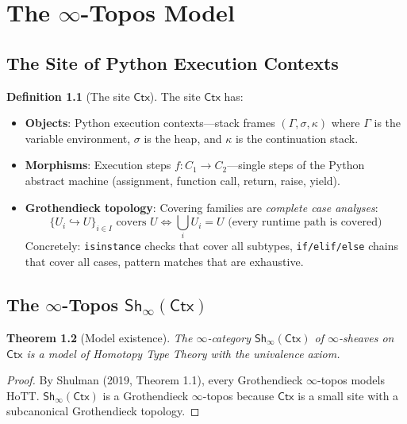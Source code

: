 \documentclass[11pt,a4paper]{report}
\theoremstyle{definition}
\newtheorem{definition}{Definition}[chapter]
\theoremstyle{plain}
\newtheorem{theorem}[definition]{Theorem}
\newcommand{\Ctx}{\mathsf{Ctx}}
\newcommand{\Sh}{\mathsf{Sh}}
\begin{document}
\chapter{The $\infty$-Topos Model}
\label{ch:model}

\section{The Site of Python Execution Contexts}

\begin{definition}[The site $\Ctx$]
The site $\Ctx$ has:
\begin{itemize}
  \item \textbf{Objects}: Python execution contexts---stack frames $(\Gamma, \sigma, \kappa)$
    where $\Gamma$ is the variable environment, $\sigma$ is the heap, and $\kappa$ is
    the continuation stack.
  \item \textbf{Morphisms}: Execution steps $f : C_1 \to C_2$---single steps of
    the Python abstract machine (assignment, function call, return, raise, yield).
  \item \textbf{Grothendieck topology}: Covering families are \emph{complete
    case analyses}:
    \[
      \{U_i \hookrightarrow U\}_{i \in I} \text{ covers } U \iff
      \bigcup_i U_i = U \text{ (every runtime path is covered)}
    \]
    Concretely: \lstinline[style=python]{isinstance} checks that cover all subtypes,
    \lstinline[style=python]{if/elif/else} chains that cover all cases, pattern
    matches that are exhaustive.
\end{itemize}
\end{definition}

\section{The $\infty$-Topos $\Sh_\infty(\Ctx)$}

\begin{theorem}[Model existence]
\label{thm:model}
The $\infty$-category $\Sh_\infty(\Ctx)$ of $\infty$-sheaves on $\Ctx$ is a
model of Homotopy Type Theory with the univalence axiom.
\end{theorem}
\begin{proof}
By Shulman (2019, Theorem 1.1), every Grothendieck $\infty$-topos models HoTT.
$\Sh_\infty(\Ctx)$ is a Grothendieck $\infty$-topos because $\Ctx$ is a small
site with a subcanonical Grothendieck topology.
\end{proof}
\end{document}
